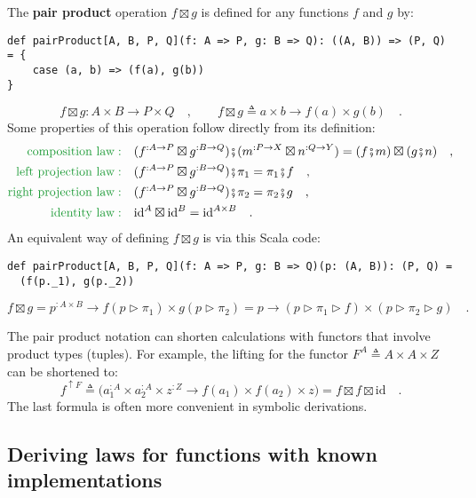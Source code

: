 The \textbf{pair product}
operation $f\boxtimes g$ is defined for any functions $f$ and $g$
by:
\begin{lstlisting}
def pairProduct[A, B, P, Q](f: A => P, g: B => Q): ((A, B)) => (P, Q) = {
    case (a, b) => (f(a), g(b))
}
\end{lstlisting}
\[
f\boxtimes g:A\times B\rightarrow P\times Q\quad,\quad\quad f\boxtimes g\triangleq a\times b\rightarrow f(a)\times g(b)\quad.
\]
Some  properties of this operation follow directly from its definition:
\begin{align}
{\color{greenunder}\text{composition law}:}\quad & (f^{:A\rightarrow P}\boxtimes g^{:B\rightarrow Q})\bef(m^{:P\rightarrow X}\boxtimes n^{:Q\rightarrow Y})=(f\bef m)\boxtimes(g\bef n)\quad,\label{eq:pair-product-composition-law}\\
{\color{greenunder}\text{left projection law}:}\quad & (f^{:A\rightarrow P}\boxtimes g^{:B\rightarrow Q})\bef\pi_{1}=\pi_{1}\bef f\quad,\label{eq:pair-product-left-projection-law}\\
{\color{greenunder}\text{right projection law}:}\quad & (f^{:A\rightarrow P}\boxtimes g^{:B\rightarrow Q})\bef\pi_{2}=\pi_{2}\bef g\quad,\label{eq:pair-product-right-projection-law}\\
{\color{greenunder}\text{identity law}:}\quad & \text{id}^{A}\boxtimes\text{id}^{B}=\text{id}^{A\times B}\quad.\nonumber 
\end{align}
An equivalent way of defining $f\boxtimes g$ is via this Scala code:
\begin{lstlisting}
def pairProduct[A, B, P, Q](f: A => P, g: B => Q)(p: (A, B)): (P, Q) =
  (f(p._1), g(p._2))
\end{lstlisting}
\[
f\boxtimes g=p^{:A\times B}\rightarrow f(p\triangleright\pi_{1})\times g(p\triangleright\pi_{2})=p\rightarrow(p\triangleright\pi_{1}\triangleright f)\times(p\triangleright\pi_{2}\triangleright g)\quad.
\]

The pair product notation can shorten calculations with functors that
involve product types (tuples). For example, the lifting for the functor
$F^{A}\triangleq A\times A\times Z$ can be shortened to:
\[
f^{\uparrow F}\triangleq\big(a_{1}^{:A}\times a_{2}^{:A}\times z^{:Z}\rightarrow f(a_{1})\times f(a_{2})\times z\big)=f\boxtimes f\boxtimes\text{id}\quad.
\]
The last formula is often more convenient in symbolic derivations. 

\subsection{Deriving laws for functions with known implementations\label{subsec:Deriving-laws-for-functions-}}

